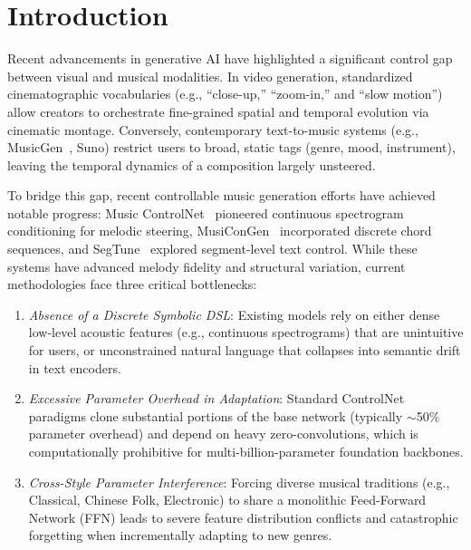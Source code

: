 \documentclass[conference]{IEEEtran}
\begin{document}
\section{Introduction}

Recent advancements in generative AI have highlighted a significant control gap between visual and musical modalities. In video generation, standardized cinematographic vocabularies (e.g., ``close-up,'' ``zoom-in,'' and ``slow motion'') allow creators to orchestrate fine-grained spatial and temporal evolution via cinematic montage. Conversely, contemporary text-to-music systems (e.g., MusicGen~\cite{musicgen}, Suno) restrict users to broad, static tags (genre, mood, instrument), leaving the temporal dynamics of a composition largely unsteered.

To bridge this gap, recent controllable music generation efforts have achieved notable progress: Music ControlNet~\cite{musiccontrolnet} pioneered continuous spectrogram conditioning for melodic steering, MusiConGen~\cite{musecong} incorporated discrete chord sequences, and SegTune~\cite{segtune} explored segment-level text control. While these systems have advanced melody fidelity and structural variation, current methodologies face three critical bottlenecks:
\begin{enumerate}[label=(\roman*),leftmargin=*]
    \item \textit{Absence of a Discrete Symbolic DSL}: Existing models rely on either dense low-level acoustic features (e.g., continuous spectrograms) that are unintuitive for users, or unconstrained natural language that collapses into semantic drift in text encoders.
    \item \textit{Excessive Parameter Overhead in Adaptation}: Standard ControlNet paradigms clone substantial portions of the base network (typically $\sim$50\% parameter overhead) and depend on heavy zero-convolutions, which is computationally prohibitive for multi-billion-parameter foundation backbones.
    \item \textit{Cross-Style Parameter Interference}: Forcing diverse musical traditions (e.g., Classical, Chinese Folk, Electronic) to share a monolithic Feed-Forward Network (FFN) leads to severe feature distribution conflicts and catastrophic forgetting when incrementally adapting to new genres.
\end{enumerate}
\end{document}
